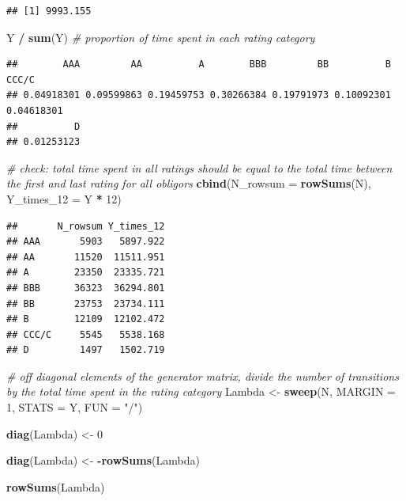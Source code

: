 \documentclass[
  11pt,
]{article}
\newenvironment{Shaded}{\begin{snugshade}}{\end{snugshade}}
\newcommand{\AttributeTok}[1]{\textcolor[rgb]{0.13,0.29,0.53}{#1}}
\newcommand{\CommentTok}[1]{\textcolor[rgb]{0.56,0.35,0.01}{\textit{#1}}}
\newcommand{\DecValTok}[1]{\textcolor[rgb]{0.00,0.00,0.81}{#1}}
\newcommand{\FunctionTok}[1]{\textcolor[rgb]{0.13,0.29,0.53}{\textbf{#1}}}
\newcommand{\NormalTok}[1]{#1}
\newcommand{\OtherTok}[1]{\textcolor[rgb]{0.56,0.35,0.01}{#1}}
\newcommand{\SpecialCharTok}[1]{\textcolor[rgb]{0.81,0.36,0.00}{\textbf{#1}}}
\newcommand{\StringTok}[1]{\textcolor[rgb]{0.31,0.60,0.02}{#1}}
\begin{document}
\begin{verbatim}
## [1] 9993.155
\end{verbatim}

\begin{Shaded}
\begin{Highlighting}[]
\NormalTok{Y }\SpecialCharTok{/} \FunctionTok{sum}\NormalTok{(Y) }\CommentTok{\# proportion of time spent in each rating category}
\end{Highlighting}
\end{Shaded}

\begin{verbatim}
##        AAA         AA          A        BBB         BB          B      CCC/C 
## 0.04918301 0.09599863 0.19459753 0.30266384 0.19791973 0.10092301 0.04618301 
##          D 
## 0.01253123
\end{verbatim}

\begin{Shaded}
\begin{Highlighting}[]
\CommentTok{\# check: total time spent in all ratings should be equal to the total time between the first and last rating for all obligors}
\FunctionTok{cbind}\NormalTok{(}\AttributeTok{N\_rowsum =} \FunctionTok{rowSums}\NormalTok{(N), }\AttributeTok{Y\_times\_12 =}\NormalTok{ Y }\SpecialCharTok{*} \DecValTok{12}\NormalTok{)}
\end{Highlighting}
\end{Shaded}

\begin{verbatim}
##       N_rowsum Y_times_12
## AAA       5903   5897.922
## AA       11520  11511.951
## A        23350  23335.721
## BBB      36323  36294.801
## BB       23753  23734.111
## B        12109  12102.472
## CCC/C     5545   5538.168
## D         1497   1502.719
\end{verbatim}

\begin{Shaded}
\begin{Highlighting}[]
\CommentTok{\# off diagonal elements of the generator matrix, divide the number of transitions by the total time spent in the rating category}
\NormalTok{Lambda }\OtherTok{\textless{}{-}} \FunctionTok{sweep}\NormalTok{(N, }\AttributeTok{MARGIN =} \DecValTok{1}\NormalTok{, }\AttributeTok{STATS =}\NormalTok{ Y, }\AttributeTok{FUN =} \StringTok{"/"}\NormalTok{)}

\FunctionTok{diag}\NormalTok{(Lambda) }\OtherTok{\textless{}{-}} \DecValTok{0}

\FunctionTok{diag}\NormalTok{(Lambda) }\OtherTok{\textless{}{-}} \SpecialCharTok{{-}}\FunctionTok{rowSums}\NormalTok{(Lambda)}

\FunctionTok{rowSums}\NormalTok{(Lambda)}
\end{Highlighting}
\end{Shaded}
\end{document}

